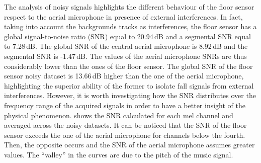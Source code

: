 The analysis of noisy signals highlights the different behaviour of the floor sensor respect to the aerial microphone in presence of external interferences. 
In fact, taking into account the backgrounds tracks as interferences, the floor sensor has a global signal-to-noise ratio (SNR) equal to 20.94\,dB and a segmental SNR equal to 7.28\,dB. The global SNR of the central aerial microphone is 8.92\,dB and the segmental SNR is -1.47\,dB. The values of the aerial microphone SNRs are thus considerably lower than the ones of the floor sensor.%
The global SNR of the floor sensor noisy dataset is 13.66\,dB higher than the one of the aerial microphone, highlighting the superior ability of the former to isolate fall signals from external interferences. However, it is worth investigating how the SNR distributes over the frequency range of the acquired signals in order to have a better insight of the physical phenomenon.  shows the SNR calculated for each mel channel and averaged across the noisy datasets. It can be noticed that the SNR of the floor sensor exceeds the one of the aerial microphone for channels below the fourth. Then, the opposite occurs and the SNR of the aerial microphone assumes greater values. The ``valley'' in the curves are due to the pitch of the music signal.


